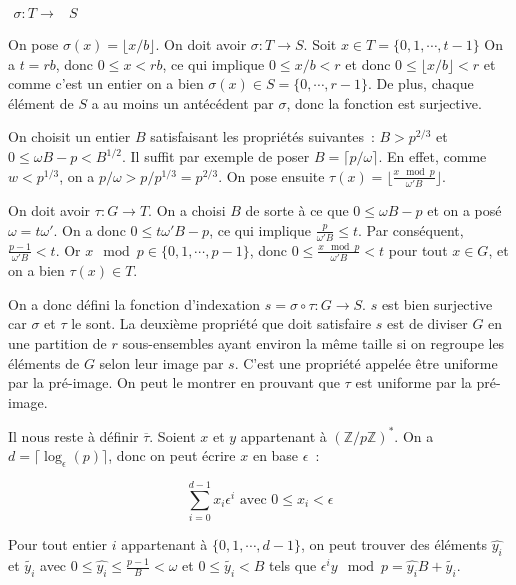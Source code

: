		$\begin{array}{lrcl}
		\sigma : T \longrightarrow & S
		\end{array}$
		
		On pose $\sigma(x) = \lfloor x/b \rfloor$. On doit avoir $\sigma : T \longrightarrow S$. Soit $x \in T = \{0,1,\cdots,t-1\}$ On a $t = rb$, donc $0 \leq x < rb$, ce qui implique $0 \leq x/b < r$ et donc $0 \leq \lfloor x/b \rfloor < r$ et comme c'est un entier on a bien $\sigma(x) \in S=\{0,\cdots,r-1\}$. De plus, chaque élément de $S$ a au moins un antécédent par $\sigma$, donc la fonction est surjective.
		
		On choisit un entier $B$ satisfaisant les propriétés suivantes~:  $B > p^{2/3}$ et $0 \leq \omega B - p < B^{1/2}$. Il suffit par exemple de poser $B = \lceil p/\omega \rceil$. En effet, comme $w < p^{1/3}$, on a $p/\omega > p/p^{1/3} = p^{2/3}$. On pose ensuite $\tau(x) = \lfloor \frac{x\mod p}{\omega' B} \rfloor$.
		
		On doit avoir $\tau : G \longrightarrow T$. On a choisi $B$ de sorte à ce que $0 \leq \omega B - p$ et on a posé $\omega = t\omega'$. On a donc $0 \leq t \omega' B - p$, ce qui implique $\frac{p}{\omega' B} \leq t$. Par conséquent, $\frac{p-1}{\omega' B} < t$. Or $x\mod p \in \{0,1,\cdots,p-1\}$, donc $0 \leq \frac{x\mod p}{\omega' B} < t$ pour tout $x \in G$, et on a bien $\tau(x) \in T$.
		
		On a donc défini la fonction d'indexation $s = \sigma \circ \tau : G \longrightarrow S$. $s$ est bien surjective car $\sigma$ et $\tau$ le sont. La deuxième propriété que doit satisfaire $s$ est de diviser $G$ en une partition de $r$ sous-ensembles ayant environ la même taille si on regroupe les éléments de $G$ selon leur image par $s$. C'est une propriété appelée être uniforme par la pré-image. On peut le montrer en prouvant que $\tau$ est uniforme par la pré-image.
		
		Il nous reste à définir $\overline{\tau}$. Soient $x$ et $y$ appartenant à $(\mathbb{Z}/p\mathbb{Z})^*$. On a $d = \lceil\log_\epsilon(p)\rceil$, donc on peut écrire $x$ en base $\epsilon$~:
		
		$$ \sum_{i=0}^{d-1} x_i \epsilon^i \text{ avec $0 \leq x_i < \epsilon$} $$
		
		Pour tout entier $i$ appartenant à $\{0,1,\cdots,d-1\}$, on peut trouver des éléments $\hat{y_i}$ et $\tilde{y_i}$ avec $0 \leq \hat{y_i} \leq \frac{p-1}{B} < \omega$ et $0 \leq \tilde{y_i} < B$ tels que $\epsilon^i y\mod p = \hat{y_i} B + \tilde{y_i}$.
		
